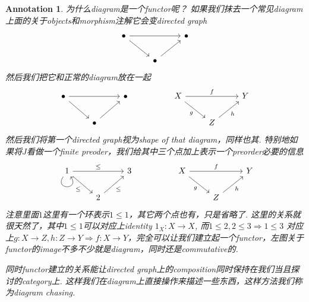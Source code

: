 \documentclass{article}
\newtheorem{annotation}[theorem]{Annotation}
\begin{document}
\begin{annotation}
\rm 为什么diagram是一个functor呢？ 如果我们抹去一个常见diagram上面的关于objects和morphism注解它会变directed graph
$$
\begin{tikzcd}
\bullet \arrow[rr] \arrow[rd] &                    & \bullet \\
                              & \bullet \arrow[ru] &        
\end{tikzcd}
$$
然后我们把它和正常的diagram放在一起
$$
\begin{tikzcd}
\bullet \arrow[rr] \arrow[rd] &                    & \bullet &  & X \arrow[rd, "g"'] \arrow[rr, "f"] &                    & Y \\
                              & \bullet \arrow[ru] &         &  &                                    & Z \arrow[ru, "h"'] &  
\end{tikzcd}
$$
然后我们将第一个directed graph视为shape of that diagram，同样也其. 特别地如果将$J$看做一个finite preoder，我们给其中三个点加上表示一个preorder必要的信息
$$
\begin{tikzcd}
1 \arrow[rr, "\leq"] \arrow[rd, "\leq"'] \arrow[loop, distance=2em, in=305, out=235] &                       & 3 &  & X \arrow[rd, "g"'] \arrow[rr, "f"] &                    & Y \\
                                                                                     & 2 \arrow[ru, "\leq"'] &   &  &                                    & Z \arrow[ru, "h"'] &  
\end{tikzcd}
$$
注意里面$1$这里有一个环表示$1 \leq 1$，其它两个点也有，只是省略了. 这里的关系就很天然了，其中$1 \leq 1$可以对应上identity $1_X: X \to X$, 而$1 \leq 2 , 2 \leq 3 \Rightarrow 1 \leq 3$ 对应上$g: X\to Z, h: Z \to Y \Rightarrow f: X \to Y$，完全可以让我们建立起一个functor，左图关于functor的image不多不少就是diagram，同时还是commutative的. 

同时functor建立的关系能让directed graph上的composition同时保持在我们当且探讨的category上. 这样我们在diagram上直接操作来描述一些东西，这样方法我们称为diagram chasing.
\end{annotation}
\end{document}
